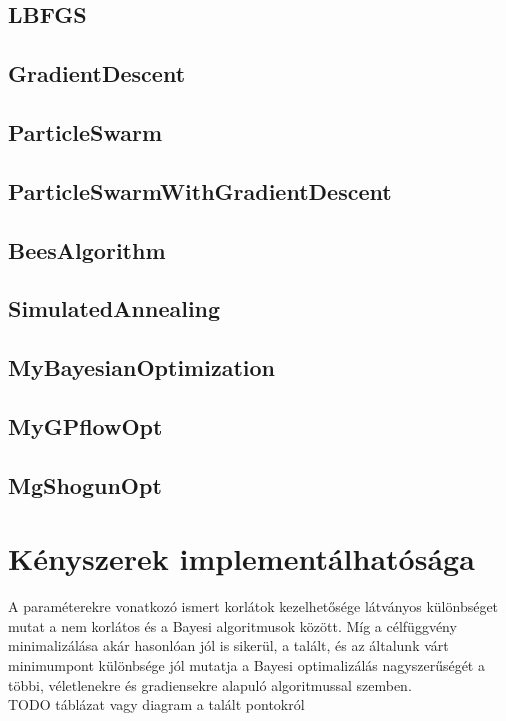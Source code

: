 \subsection{LBFGS}
\subsection{GradientDescent}
\subsection{ParticleSwarm}
\subsection{ParticleSwarmWithGradientDescent}
\subsection{BeesAlgorithm}
\subsection{SimulatedAnnealing}
\subsection{MyBayesianOptimization}
\subsection{MyGPflowOpt}
\subsection{MgShogunOpt}
\section{Kényszerek implementálhatósága}
A paraméterekre vonatkozó ismert korlátok kezelhetősége látványos különbséget mutat a nem korlátos és a Bayesi algoritmusok között. Míg a célfüggvény minimalizálása akár hasonlóan jól is sikerül, a talált, és az általunk várt minimumpont különbsége jól mutatja a Bayesi optimalizálás nagyszerűségét a többi, véletlenekre és gradiensekre alapuló algoritmussal szemben.\\
{\Huge TODO táblázat vagy diagram a talált pontokról}

